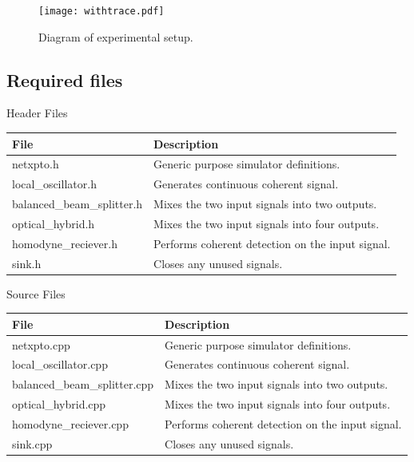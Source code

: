 \begin{figure}
\centering
\texttt{[image: withtrace.pdf]}
\caption{Diagram of experimental setup.}
\label{fig:expDia}
\end{figure}

\subsection*{Required files}\label{Required files}

Header Files
\begin{table}[H]
\centering
\begin{tabulary}{1.0\textwidth}{|L|L|}
\hline
\textbf{File}              & \textbf{Description} 				            \\ \hline
netxpto.h                  & Generic purpose simulator definitions.	        \\ \hline
local\_oscillator.h        & Generates continuous coherent signal.            \\ \hline
balanced\_beam\_splitter.h & Mixes the two input signals into two outputs.    \\ \hline
optical\_hybrid.h          & Mixes the two input signals into four outputs.   \\ \hline
homodyne\_reciever.h       & Performs coherent detection on the input signal. \\ \hline
sink.h                     & Closes any unused signals.                       \\ \hline
\end{tabulary}
\end{table}
%
Source Files
\begin{table}[H]
\centering
\begin{tabulary}{1.0\textwidth}{|L|L|}
\hline
\textbf{File}                & \textbf{Description} 					          \\ \hline
netxpto.cpp                  & Generic purpose simulator definitions.	          \\ \hline
local\_oscillator.cpp        & Generates continuous coherent signal.            \\ \hline
balanced\_beam\_splitter.cpp & Mixes the two input signals into two outputs.    \\ \hline
optical\_hybrid.cpp          & Mixes the two input signals into four outputs.   \\ \hline
homodyne\_reciever.cpp       & Performs coherent detection on the input signal. \\ \hline
sink.cpp                     & Closes any unused signals.                       \\ \hline
\end{tabulary}
\end{table}


